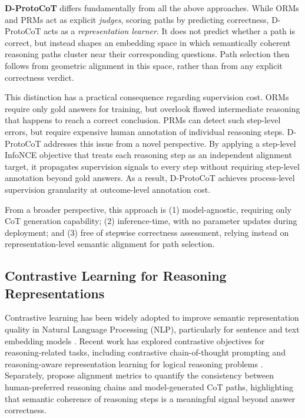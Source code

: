 \documentclass[a4paper,fleqn]{cas-dc}
\begin{document}
\textbf{D-ProtoCoT} differs fundamentally from all the above approaches.
While ORMs and PRMs act as explicit \textit{judges}, scoring paths by predicting correctness, D-ProtoCoT acts as a \textit{representation learner}. It does not predict whether a path is correct, but instead shapes an embedding space in which semantically coherent reasoning paths cluster near their corresponding questions.
Path selection then follows from geometric alignment in this space, rather than from any explicit correctness verdict.

This distinction has a practical consequence regarding supervision cost.
ORMs require only gold answers for training, but overlook flawed intermediate reasoning that happens to reach a correct conclusion.
PRMs can detect such step-level errors, but require expensive human annotation of individual reasoning steps.
D-ProtoCoT addresses this issue from a novel perspective. By applying a step-level InfoNCE objective that treats each reasoning step as an independent alignment target, it propagates supervision signals to every step without requiring step-level annotation beyond gold answers.
As a result, D-ProtoCoT achieves process-level supervision granularity at outcome-level annotation cost.

From a broader perspective, this approach is (1) model-agnostic, requiring only CoT generation capability; (2) inference-time, with no parameter updates during deployment; and (3) free of stepwise correctness assessment, relying instead on representation-level semantic alignment for path selection.

\subsection{Contrastive Learning for Reasoning Representations}

Contrastive learning has been widely adopted to improve semantic representation quality in Natural Language Processing (NLP), particularly for sentence and text embedding models \citep{gao2021simcse, gunel2021supervised}.
Recent work has explored contrastive objectives for reasoning-related tasks, including contrastive chain-of-thought prompting \citep{chia2023contrastivechainofthoughtprompting} and reasoning-aware representation learning for logical reasoning problems \citep{yao2023reclor}.
Separately, \citet{wang2025chasing} propose alignment metrics to quantify the consistency between human-preferred reasoning chains and model-generated CoT paths, highlighting that semantic coherence of reasoning steps is a meaningful signal beyond answer correctness.
\end{document}
